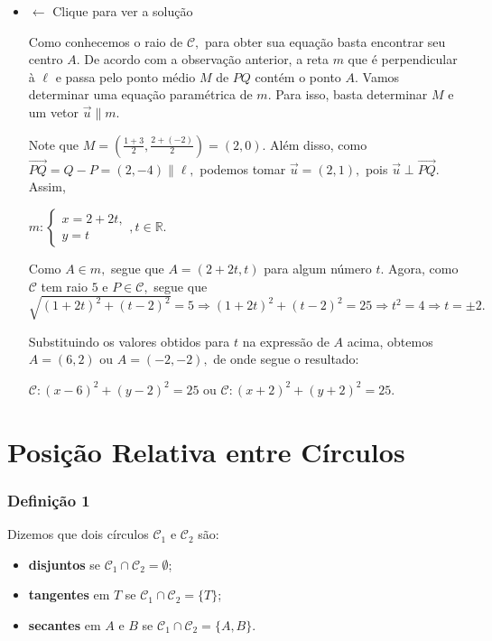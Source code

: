 \documentclass[
  brazilian,
  letterpaper,
  DIV=11,
  numbers=noendperiod]{scrreprt}
\providecommand{\tightlist}{%
  \setlength{\itemsep}{0pt}\setlength{\parskip}{0pt}}
\theoremstyle{definition}
\theoremstyle{plain}
\theoremstyle{definition}
\theoremstyle{remark}
\begin{document}
\begin{itemize}
\item
  \(\leftarrow\) Clique para ver a solução

  Como conhecemos o raio de \(\mathcal{C},\) para obter sua equação
  basta encontrar seu centro \(A.\) De acordo com a observação anterior,
  a reta \(m\) que é perpendicular à \(\ell\) e passa pelo ponto médio
  \(M\) de \(PQ\) contém o ponto \(A.\) Vamos determinar uma equação
  paramétrica de \(m.\) Para isso, basta determinar \(M\) e um vetor
  \(\vec{u}\parallel m.\)

  Note que \(M=\left(\frac{1+3}{2},\frac{2+(-2)}{2}\right)=(2,0).\) Além
  disso, como \(\overrightarrow{PQ} =Q-P = (2,-4)\parallel \ell,\)
  podemos tomar \(\vec{u}=(2,1),\) pois
  \(\vec{u} \perp \overrightarrow{PQ}.\) Assim,

  \(m: \left\{ \begin{array}{c}
    x= 2 + 2t, \\
    y= t
    \end{array} \right. ,  t\in \mathbb{R}.\)

  Como \(A\in m,\) segue que \(A=(2+2t,t)\) para algum número \(t.\)
  Agora, como \(\mathcal{C}\) tem raio \(5\) e \(P\in \mathcal{C},\)
  segue que
  \(\sqrt{(1+2t)^2+(t-2)^2}=5\Rightarrow(1+2t)^2+(t-2)^2=25\Rightarrow t^2=4\Rightarrow t=\pm2.\)

  Substituindo os valores obtidos para \(t\) na expressão de \(A\)
  acima, obtemos \(A=(6,2)\) ou \(A=(-2,-2),\) de onde segue o
  resultado:

  \(\mathcal{C}: (x-6)^2 + (y-2)^2=25\) ou
  \(\mathcal{C}: (x+2)^2 + (y+2)^2=25.\)
\end{itemize}


\chapter{Posição Relativa entre
Círculos}\label{posiuxe7uxe3o-relativa-entre-cuxedrculos}

\subsection{Definição 1}\label{definiuxe7uxe3o-1-2}

Dizemos que dois círculos \(\mathcal{C}_1\) e \(\mathcal{C}_2\) são:

\begin{itemize}
\tightlist
\item
  \textbf{disjuntos} se \(\mathcal{C}_1\cap\mathcal{C}_2=\emptyset\);
\item
  \textbf{tangentes} em \(T\) se
  \(\mathcal{C}_1\cap\mathcal{C}_2=\{T\}\);
\item
  \textbf{secantes} em \(A\) e \(B\) se
  \(\mathcal{C}_1\cap\mathcal{C}_2=\{A,B\}\).
\end{itemize}
\end{document}
